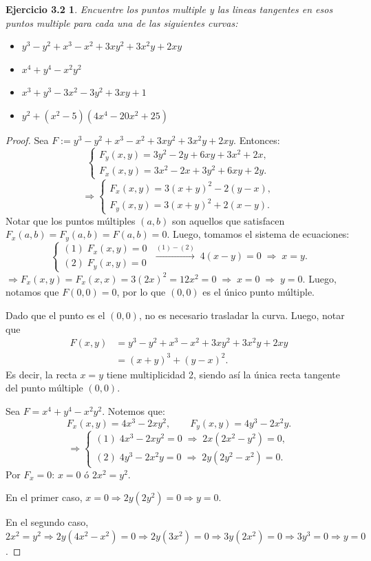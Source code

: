 \documentclass[12pt,a4paper]{article}
\theoremstyle{plain}
\newtheorem*{ejercicio6}{Ejercicio 3.2}
\begin{document}

\begin{ejercicio6}
	Encuentre los puntos multiple y las lineas tangentes en esos puntos multiple para cada una de las siguientes curvas:
	\begin{itemize}[(a)]
	  \item $y^3-y^2+x^3-x^2+3xy^2+3x^2y+2xy$
	  \item $x^4+y^4-x^2y^2$
	  \item $x^3+y^3-3x^2-3y^2+3xy+1$
	  \item $y^2+(x^2-5)(4x^4-20x^2+25)$
	\end{itemize}
\end{ejercicio6}

\begin{proof}
	 Sea $F:=y^3-y^2+x^3-x^2+3xy^2+3x^2y+2xy$. Entonces:
	\[
	  \begin{cases}
		F_y(x,y)=3y^2-2y+6xy+3x^2+2x,\\
		F_x(x,y)=3x^2-2x+3y^2+6xy+2y.
	  \end{cases}
	\]
	\[
	  \Rightarrow\begin{cases}
		F_x(x,y)=3(x+y)^2-2(y-x),\\
		F_y(x,y)=3(x+y)^2+2(x-y).
	  \end{cases}
	\]
	Notar que los puntos múltiples $(a,b)$ son aquellos que satisfacen $F_x(a,b)=F_y(a,b)=F(a,b)=0$. Luego, tomamos el sistema de ecuaciones:
	\[
	  \begin{cases}
		(1)\; F_x(x,y)=0\\
		(2)\; F_y(x,y)=0
	  \end{cases}
	  \;\xrightarrow{(1)-(2)}\; 4(x-y)=0\;\Rightarrow\; x=y.
	\]
	$\Rightarrow F_x(x,y)=F_x(x,x)=3(2x)^2=12x^2=0\;\Rightarrow\; x=0\;\Rightarrow\; y=0$. Luego, notamos que $F(0,0)=0$, por lo que $(0,0)$ es el único punto múltiple.

	Dado que el punto es el $(0,0)$, no es necesario trasladar la curva. Luego, notar que
	\begin{align*}
	  F(x,y) &= y^3-y^2+x^3-x^2+3xy^2+3x^2y+2xy\\
			  &= (x+y)^3+(y-x)^2.
	\end{align*}
	Es decir, la recta $x=y$ tiene multiplicidad 2, siendo así la única recta tangente del punto múltiple $(0,0)$.

	\bigskip
	 Sea $F=x^4+y^4-x^2y^2$. Notemos que:
	\[
	  F_x(x,y)=4x^3-2xy^2,\qquad F_y(x,y)=4y^3-2x^2y.
	\]
	\[
	  \Rightarrow\begin{cases}
		(1)\; 4x^3-2xy^2=0\;\Rightarrow\; 2x(2x^2-y^2)=0,\\
		(2)\; 4y^3-2x^2y=0\;\Rightarrow\; 2y(2y^2-x^2)=0.
	  \end{cases}
	\]
	Por $F_x=0$: $x=0$ ó $2x^2=y^2$. \par
	En el primer caso, $x=0\Rightarrow 2y(2y^2)=0\Rightarrow y=0$. \par
	En el segundo caso, $2x^2=y^2\Rightarrow 2y(4x^2-x^2)=0\Rightarrow 2y(3x^2)=0\Rightarrow 3y(2x^2)=0\Rightarrow 3y^3=0\Rightarrow y=0$.


\end{proof}
\end{document}
